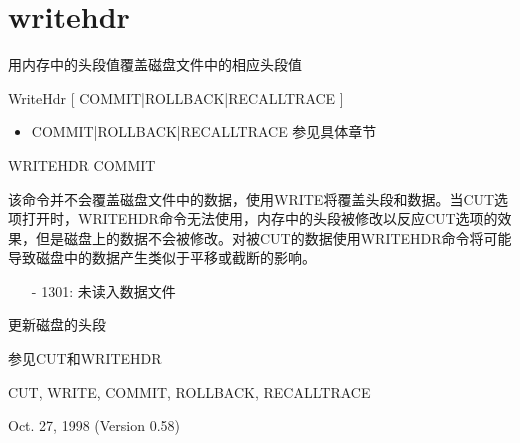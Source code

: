 \section{writehdr}
\label{cmd:writehdr}

用内存中的头段值覆盖磁盘文件中的相应头段值

WriteHdr [ COMMIT|ROLLBACK|RECALLTRACE ]

\begin{itemize}
\item COMMIT|ROLLBACK|RECALLTRACE 参见具体章节
\end{itemize}

WRITEHDR COMMIT

该命令并不会覆盖磁盘文件中的数据，使用WRITE将覆盖头段和数据。当CUT选项打开时，WRITEHDR命令无法使用，内存中的头段被修改以反应CUT选项的效果，但是磁盘上的数据不会被修改。对被CUT的数据使用WRITEHDR命令将可能导致磁盘中的数据产生类似于平移或截断的影响。

\begin{itemize}
\item[-]1301: 未读入数据文件
\end{itemize}

更新磁盘的头段

参见CUT和WRITEHDR

CUT, WRITE, COMMIT, ROLLBACK, RECALLTRACE

Oct. 27, 1998 (Version 0.58)
